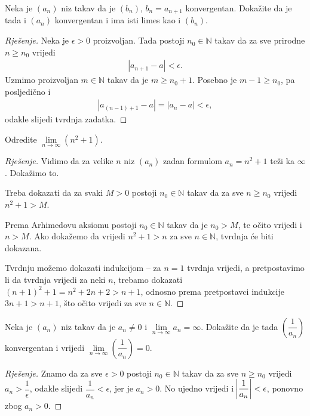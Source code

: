 \begin{exercise}
\label{41}
Neka je $(a_n)$ niz takav da je $(b_n)$, $b_n=a_{n+1}$ konvergentan. Dokažite da je tada i $(a_n)$ konvergentan i ima isti limes kao i $(b_n)$.
\end{exercise}
\begin{proof}[Rješenje]
Neka je $\epsilon>0$ proizvoljan. Tada postoji $n_0\in \mathbb{N}$ takav da za sve prirodne $n\geq n_0$ vrijedi
\begin{gather}
\label{anplus1}
|a_{n+1}-a|<\epsilon.
\end{gather}
Uzmimo proizvoljan $m\in \mathbb{N}$ takav da je $m\geq n_0+1$. Posebno je $m-1\geq n_0$, pa posljedično i
\begin{gather}
\label{40}
|a_{(n-1)+1}-a|=|a_n-a|<\epsilon,
\end{gather}
odakle slijedi tvrdnja zadatka.
\end{proof}
\begin{exercise}
Odredite $\lim\limits_{n\to \infty} \left(n^2+1\right)$.
\end{exercise}
\begin{proof}[Rješenje]
Vidimo da za velike $n$ niz $(a_n)$ zadan formulom $a_n=n^2+1$ teži ka $\infty$. Dokažimo to. 

Treba dokazati da za svaki $M>0$ postoji $n_0\in \mathbb{N}$ takav da za sve $n\geq n_0$ vrijedi $n^2+1>M$. 

Prema Arhimedovu aksiomu postoji $n_0\in \mathbb{N}$ takav da je $n_0>M$, te očito vrijedi i $n>M$. Ako dokažemo da vrijedi $n^2+1>n$ za sve $n\in \mathbb{N}$, tvrdnja će biti dokazana. 

Tvrdnju možemo dokazati indukcijom -- za $n=1$ tvrdnja vrijedi, a pretpostavimo li da tvrdnja vrijedi za neki $n$, trebamo dokazati $(n+1)^2+1=n^2+2n+2>n+1$, odnosno prema pretpostavci indukcije $3n+1>n+1$, što očito vrijedi za sve $n\in \mathbb{N}$.
\end{proof}
\begin{exercise}
\label{6}
Neka je $(a_n)$ niz takav da je $a_n\neq 0$ i $\lim\limits_{n\to \infty}{a_n}=\infty$. Dokažite da je tada $\left(\dfrac{1}{a_n}\right)$ konvergentan i vrijedi $\lim\limits_{n\to \infty}\left(\dfrac{1}{a_n}\right)=0$.
\end{exercise}
\begin{proof}[Rješenje]
Znamo da za sve $\epsilon>0$ postoji $n_0\in \mathbb{N}$ takav da za sve $n\geq n_0$ vrijedi $a_n>\dfrac{1}{\epsilon}$, odakle slijedi $\dfrac{1}{a_n}<\epsilon$, jer je $a_n>0$. No ujedno vrijedi i $\abs{\dfrac{1}{a_n}}<\epsilon$, ponovno zbog $a_n>0$.
\end{proof}
